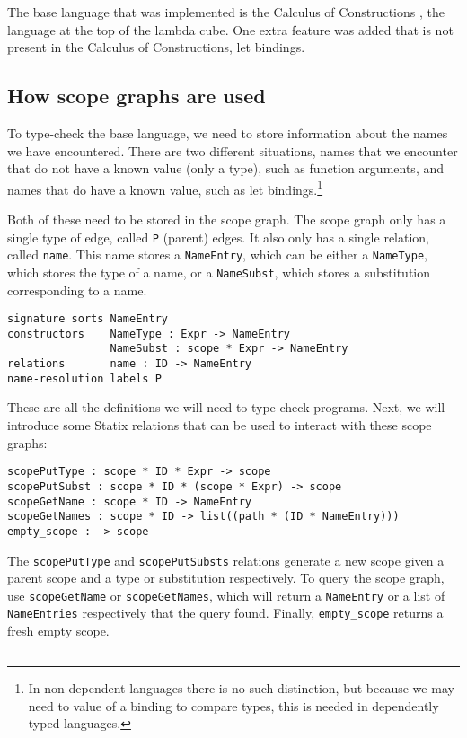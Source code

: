 \documentclass[a4paper,UKenglish,cleveref, autoref, thm-restate]{oasics-v2021}
\begin{document}
The base language that was implemented is the Calculus of Constructions \cite{Coquand_Huet_1988}, the language at the top of the lambda cube. One extra feature was added that is not present in the Calculus of Constructions, let bindings.

\subsection{How scope graphs are used}

To type-check the base language, we need to store information about the names we have encountered. There are two different situations, names that we encounter that do not have a known value (only a type), such as function arguments, and names that do have a known value, such as let bindings.\footnote{In non-dependent languages there is no such distinction, but because we may need to value of a binding to compare types, this is needed in dependently typed languages.}

Both of these need to be stored in the scope graph. The scope graph only has a single type of edge, called \verb|P| (parent) edges. It also only has a single relation, called \verb|name|. This name stores a \verb|NameEntry|, which can be either a \verb|NameType|, which stores the type of a name, or a \verb|NameSubst|, which stores a substitution corresponding to a name. 

\begin{lstlisting}
signature sorts	NameEntry
constructors    NameType : Expr -> NameEntry
                NameSubst : scope * Expr -> NameEntry
relations       name : ID -> NameEntry
name-resolution	labels P
\end{lstlisting}

These are all the definitions we will need to type-check programs. Next, we will introduce some Statix relations that can be used to interact with these scope graphs:

\begin{lstlisting}
scopePutType : scope * ID * Expr -> scope
scopePutSubst : scope * ID * (scope * Expr) -> scope
scopeGetName : scope * ID -> NameEntry
scopeGetNames : scope * ID -> list((path * (ID * NameEntry)))
empty_scope : -> scope
\end{lstlisting}

The \verb|scopePutType| and \verb|scopePutSubsts| relations generate a new scope given a parent scope and a type or substitution respectively. To query the scope graph, use \verb|scopeGetName| or \verb|scopeGetNames|, which will return a \verb|NameEntry| or a list of \verb|NameEntries| respectively that the query found. Finally, \verb|empty_scope| returns a fresh empty scope.

\subsection{}



\end{document}
